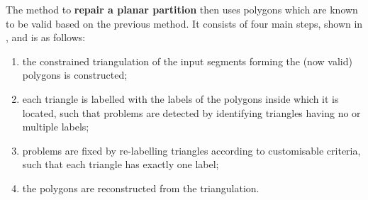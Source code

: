 The method to \textbf{repair a planar partition} then uses polygons which are known to be valid based on the previous method.
It consists of four main steps, shown in , and is as follows: 
\begin{enumerate}
 \item the constrained triangulation of the input segments forming the (now valid) polygons is constructed;
 \item each triangle is labelled with the labels of the polygons inside which it is located, such that problems are detected by identifying triangles having no or multiple labels;
 \item problems are fixed by re-labelling triangles according to customisable criteria, such that each triangle has exactly one label;
 \item the polygons are reconstructed from the triangulation.
\end{enumerate}

